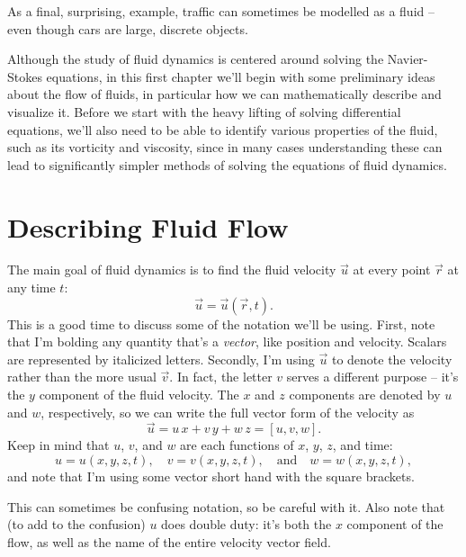 As a final, surprising, example, traffic can sometimes be modelled as a fluid -- even though cars are large, discrete objects.

Although the study of fluid dynamics is centered around solving the Navier-Stokes equations, in this first chapter we'll begin with some preliminary ideas about the flow of fluids, in particular how we can mathematically describe and visualize it.  Before we start with the heavy lifting of solving differential equations, we'll also need to be able to identify various properties of the fluid, such as its vorticity and viscosity, since in many cases understanding these can lead to significantly simpler methods of solving the equations of fluid dynamics.

%
%
%

\section{Describing Fluid Flow}

The main goal of fluid dynamics is to find the fluid velocity $\vec{u}$ at every point $\vec{r}$ at any time $t$:
\begin{equation}
\vec{u} = \vec{u}(\vec{r}, t).
\end{equation}
This is a good time to discuss some of the notation we'll be using.  First, note that I'm bolding any quantity that's a \emph{vector}, like position and velocity.  Scalars are represented by italicized letters.  Secondly, I'm using $\vec{u}$ to denote the velocity rather than the more usual $\vec{v}$. In fact, the letter $v$ serves a different purpose -- it's the $y$ component of the fluid velocity. The $x$ and $z$ components are denoted by $u$ and $w$, respectively, so we can write the full vector form of the velocity as
\begin{equation}
\vec{u} = u \, \unit{x} + v \, \unit{y} + w \, \unit{z} = [u, v, w].
\end{equation}
Keep in mind that $u$, $v$, and $w$ are each functions of $x$, $y$, $z$, and time:
\[
u = u(x, y, z, t), \quad v = v(x, y, z, t), \quad \text{and} \quad w = w(x, y, z, t),
\]
and note that I'm using some vector short hand with the square brackets.

This can sometimes be confusing notation, so be careful with it.  Also note that (to add to the confusion) $u$ does double duty: it's both the $x$ component of the flow, as well as the name of the entire velocity vector field.


